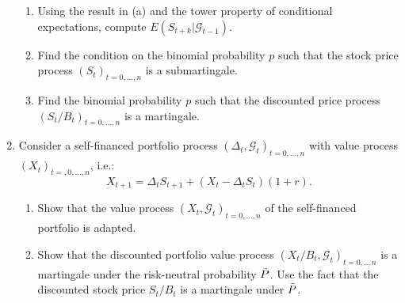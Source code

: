 \documentclass[11pt,a4,table]{article}
\begin{document}
\begin{enumerate}
\begin{enumerate}
        \item Using the result in (a) and the tower property of conditional expectations, compute $E(S_{t+k}|\mathcal{G}_{t-1})$.
        
        \item Find the condition on the binomial probability $p$ such that the stock price process $(S_t)_{t=0,...,n}$ is a submartingale.
        
        \item Find the binomial probability $p$ such that the discounted price process $(S_t/B_t)_{t=0,...,n}$ is a martingale.
    \end{enumerate}
    
    
    \item Consider a self-financed portfolio process $(\Delta_t,\mathcal{G}_t)_{t=0,...,n}$ with value process $(X_t)_{t=,0,...,n}$, i.e.:
    \begin{equation*}
        X_{t+1} = \Delta_tS_{t+1} + (X_t-\Delta_t S_t)(1+r).
    \end{equation*}
    
    \begin{enumerate}
        \item Show that the value process $(X_t,\mathcal{G}_t)_{t=0,...,n}$ of the self-financed portfolio is adapted.
        
        \item Show that the discounted portfolio value process $(X_t/B_t,\mathcal{G}_t)_{t=0,..,n}$ is a martingale under the risk-neutral probability $\Tilde{P}$. Use the fact that the discounted stock price $S_t/B_t$ is a martingale under $\Tilde{P}$.
    \end{enumerate}
    
\end{enumerate}
\end{document}

